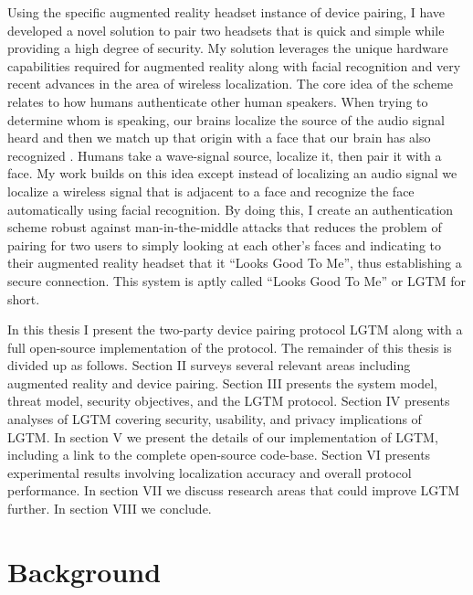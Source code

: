 \documentclass[12pt]{report}
\begin{document}
Using the specific augmented reality headset instance of device pairing, I have developed a novel solution to pair two headsets that is quick and simple while providing a high degree of security. My solution leverages the unique hardware capabilities required for augmented reality along with facial recognition and very recent advances in the area of wireless localization. The core idea of the scheme relates to how humans authenticate other human speakers. When trying to determine whom is speaking, our brains localize the source of the audio signal heard and then we match up that origin with a face that our brain has also recognized \cite{SoundLocalizationHumanListenersMiddlebrooks1991,FaceVoicePersonPerceptionCampanella2016}. Humans take a wave-signal source, localize it, then pair it with a face. My work builds on this idea except instead of localizing an audio signal we localize a wireless signal that is adjacent to a face and recognize the face automatically using facial recognition. By doing this, I create an authentication scheme robust against man-in-the-middle attacks that reduces the problem of pairing for two users to simply looking at each other's faces and indicating to their augmented reality headset that it ``Looks Good To Me'', thus establishing a secure connection. This system is aptly called ``Looks Good To Me'' or LGTM for short. \par

In this thesis I present the two-party device pairing protocol LGTM along with a full open-source implementation of the protocol. The remainder of this thesis is divided up as follows. Section II surveys several relevant areas including augmented reality and device pairing. Section III presents the system model, threat model, security objectives, and the LGTM protocol. Section IV presents analyses of LGTM covering security, usability, and privacy implications of LGTM. In section V we present the details of our implementation of LGTM, including a link to the complete open-source code-base. Section VI presents experimental results involving localization accuracy and overall protocol performance. In section VII we discuss research areas that could improve LGTM further. In section VIII we conclude. \par


\section{Background}
\end{document}
